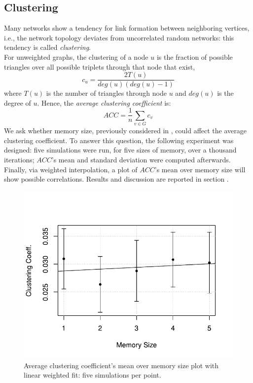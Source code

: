 \subsection{Clustering} \label{clustering}
Many networks show a tendency for link formation
between neighboring vertices, i.e., the network topology deviates
from uncorrelated random networks: this tendency is called
\textit{clustering}.\cite{clusterarticle}\\
For unweighted graphs, the clustering of a node $u$ is the fraction
of possible triangles over all possible triplets
through that node that exist,\cite{clustersite}
%
\begin{equation}
  \label{eq:clustering}
  c_u = \frac{2 T(u)}{deg(u)(deg(u)-1)}
\end{equation}
where $T(u)$ is the number of triangles through node $u$ and $deg(u)$
is the degree of $u$.
Hence, the \textit{average clustering coefficient}  is:
\begin{equation}
  \label{eq:averageclustering}
  ACC = \frac{1}{n}\sum_{v \in G} c_v
\end{equation}
We ask whether memory size, previously considered in
, could affect the average clustering coefficient.
To answer this question, the following experiment was designed:
five simulations were run, for five sizes of memory, over a thousand
iterations; $ACC$'s mean and standard deviation were computed
afterwards.\\
Finally, via weighted interpolation, a plot of $ACC$'s mean
over memory size will show possible  correlations.
Results and discussion are reported in section .
\begin{figure}[h!]
  \centering
  \includegraphics[trim={0cm 0cm 0cm 1cm},clip,width=.8\columnwidth]{img/clustering.pdf}
  \caption[Average clustering coefficient's mean over memory size]
  {Average clustering coefficient's mean over memory size
    plot with linear weighted fit: five simulations per point.\label{fig:clustering}}
\end{figure}
